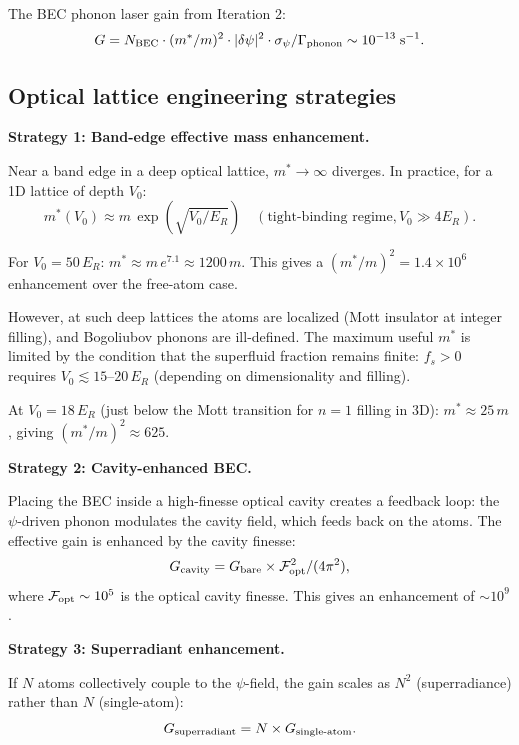 \documentclass[11pt]{article}
\newcommand{\ee}[1]{\times 10^{#1}}
\begin{document}
The BEC phonon laser gain from Iteration 2:
\begin{equation}
G = N_{\rm BEC}\cdot(m^*/m)^2\cdot|\delta\psi|^2 \cdot \sigma_\psi/\Gamma_{\rm phonon} \sim 10^{-13}\;\text{s}^{-1}.
\end{equation}

\subsection{Optical lattice engineering strategies}

\textbf{Strategy 1: Band-edge effective mass enhancement.}

Near a band edge in a deep optical lattice, $m^* \to \infty$ diverges. In practice, for a 1D lattice of depth $V_0$:
\begin{equation}
m^*(V_0) \approx m\,\exp\!\left(\sqrt{V_0/E_R}\right) \quad (\text{tight-binding regime}, V_0 \gg 4E_R).
\end{equation}

For $V_0 = 50\,E_R$: $m^* \approx m\,e^{7.1} \approx 1200\,m$. This gives a $(m^*/m)^2 = 1.4\ee{6}$ enhancement over the free-atom case.

However, at such deep lattices the atoms are localized (Mott insulator at integer filling), and Bogoliubov phonons are ill-defined. The maximum useful $m^*$ is limited by the condition that the superfluid fraction remains finite: $f_s > 0$ requires $V_0 \lesssim 15$--$20\,E_R$ (depending on dimensionality and filling).

At $V_0 = 18\,E_R$ (just below the Mott transition for $n=1$ filling in 3D): $m^* \approx 25\,m$, giving $(m^*/m)^2 \approx 625$.

\textbf{Strategy 2: Cavity-enhanced BEC.}

Placing the BEC inside a high-finesse optical cavity creates a feedback loop: the $\psi$-driven phonon modulates the cavity field, which feeds back on the atoms. The effective gain is enhanced by the cavity finesse:
\begin{equation}
G_{\rm cavity} = G_{\rm bare} \times \mathcal{F}_{\rm opt}^2 / (4\pi^2),
\end{equation}
where $\mathcal{F}_{\rm opt} \sim 10^5$ is the optical cavity finesse. This gives an enhancement of $\sim 10^9$.

\textbf{Strategy 3: Superradiant enhancement.}

If $N$ atoms collectively couple to the $\psi$-field, the gain scales as $N^2$ (superradiance) rather than $N$ (single-atom):
\begin{equation}
G_{\rm superradiant} = N \times G_{\rm single\text{-}atom}.
\end{equation}
\end{document}
